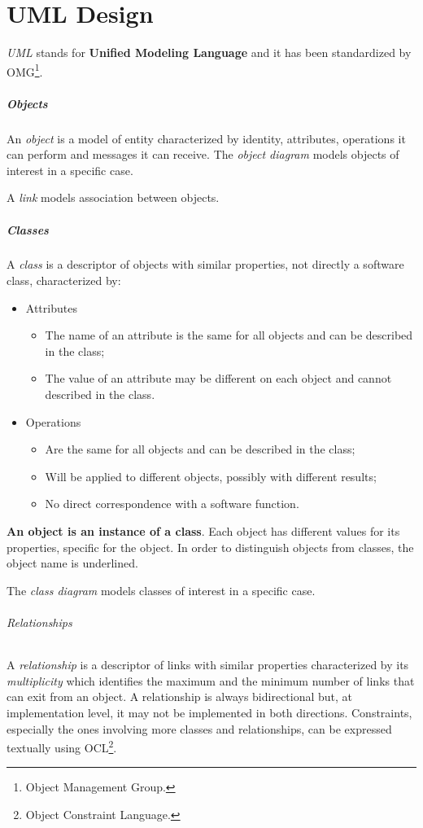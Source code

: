 \chapter{UML Design}
\emph{UML} stands for \textbf{Unified Modeling Language} and it has been standardized by OMG\footnote{Object Management Group.}.

\paragraph{Objects}
An \emph{object} is a model of entity characterized by identity, attributes, operations it can perform and messages it can receive. The \emph{object diagram} models objects of interest in a specific case.

A \emph{link} models association between objects.

\paragraph{Classes}
A \emph{class} is a descriptor of objects with similar properties, not directly a software class, characterized by:
\begin{itemize}
\item Attributes
\begin{itemize}
\item The name of an attribute is the same for all objects and can be described in the class;
\item The value of an attribute may be different on each object and cannot described in the class.
\end{itemize}
\item Operations
\begin{itemize}
\item Are the same for all objects and can be described in the class;
\item Will be applied to different objects, possibly with different results;
\item No direct correspondence with a software function.
\end{itemize}
\end{itemize}
\textbf{An object is an instance of a class}. Each object has different values for its properties, specific for the object. In order to distinguish objects from classes, the object name is underlined.

The \emph{class diagram} models classes of interest in a specific case.

\subparagraph{Relationships}
A \emph{relationship} is a descriptor of links with similar properties characterized by its \emph{multiplicity} which identifies the maximum and the minimum number of links that can exit from an object. A relationship is always bidirectional but, at implementation level, it may not be implemented in both directions. Constraints, especially the ones involving more classes and relationships, can be expressed textually using OCL\footnote{Object Constraint Language.}.

